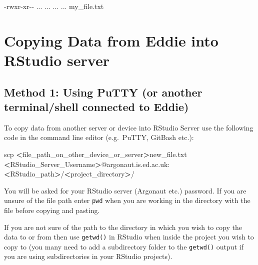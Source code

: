 \documentclass[
]{book}
\newenvironment{Shaded}{\begin{snugshade}}{\end{snugshade}}
\newcommand{\ExtensionTok}[1]{#1}
\newcommand{\FunctionTok}[1]{\textcolor[rgb]{0.00,0.00,0.00}{#1}}
\newcommand{\NormalTok}[1]{#1}
\newcommand{\OperatorTok}[1]{\textcolor[rgb]{0.81,0.36,0.00}{\textbf{#1}}}
\begin{document}
\begin{Shaded}
\begin{Highlighting}[]
\ExtensionTok{{-}rwxr{-}xr{-}{-}}\NormalTok{ ... ... ... ... my\_file.txt}
\end{Highlighting}
\end{Shaded}

\hypertarget{copying-data-from-eddie-into-rstudio-server}{%
\section{Copying Data from Eddie into RStudio server}\label{copying-data-from-eddie-into-rstudio-server}}

\hypertarget{method-1-using-putty-or-another-terminalshell-connected-to-eddie}{%
\subsection{Method 1: Using PuTTY (or another terminal/shell connected to Eddie)}\label{method-1-using-putty-or-another-terminalshell-connected-to-eddie}}

To copy data from another server or device into RStudio Server use the following code in the command line editor (e.g.~PuTTY, GitBash etc.):

\begin{Shaded}
\begin{Highlighting}[]
\FunctionTok{scp} \OperatorTok{\textless{}}\NormalTok{file\_path\_on\_other\_device\_or\_server}\OperatorTok{\textgreater{}}\NormalTok{new\_file.txt }\OperatorTok{\textless{}}\NormalTok{RStudio\_Server\_Username}\OperatorTok{\textgreater{}}\NormalTok{@argonaut.is.ed.ac.uk:}\OperatorTok{\textless{}}\NormalTok{RStudio\_path}\OperatorTok{\textgreater{}}\NormalTok{/}\OperatorTok{\textless{}}\NormalTok{project\_directory}\OperatorTok{\textgreater{}}\NormalTok{/}
\end{Highlighting}
\end{Shaded}

You will be asked for your RStudio server (Argonaut etc.) password. If you are unsure of the file path enter \texttt{pwd} when you are working in the directory with the file before copying and pasting.

If you are not sure of the path to the directory in which you wish to copy the data to or from then use \texttt{getwd()} in RStudio when inside the project you wish to copy to (you many need to add a subdirectory folder to the \texttt{getwd()} output if you are using subdirectories in your RStudio projects).
\end{document}
